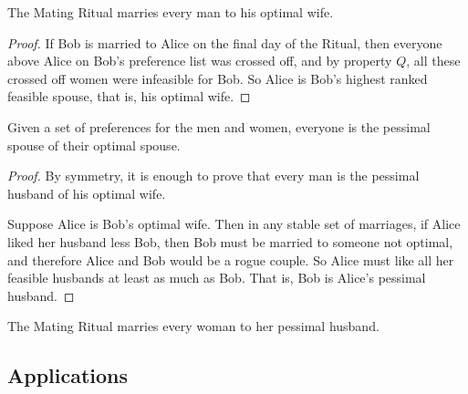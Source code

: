 \begin{theorem}\label{boyopt}
The Mating Ritual marries every man to his optimal wife.
\end{theorem}

\begin{proof}
If Bob is married to Alice on the final day of the Ritual, then
everyone above Alice on Bob's preference list was crossed off, and by
property $Q$, all these crossed off women were infeasible for Bob.  So
Alice is Bob's highest ranked feasible spouse, that is, his optimal
wife.
\end{proof}

\begin{lemma}\label{optispess}
Given a set of preferences for the men and women,
everyone is the pessimal spouse of their optimal spouse.
\end{lemma}

\begin{proof}
By symmetry, it is enough to prove that every man is the pessimal
husband of his optimal wife.

Suppose Alice is Bob's optimal wife.  Then in any stable set of
marriages, if Alice liked her husband less Bob, then Bob must be
married to someone not optimal, and therefore Alice and Bob would be a
rogue couple.  So Alice must like all her feasible husbands at least
as much as Bob.  That is, Bob is Alice's pessimal husband.
\end{proof}

\begin{corollary}
\label{girlpess}
The Mating Ritual marries every woman to her pessimal husband.
\end{corollary}

\subsection{Applications}

